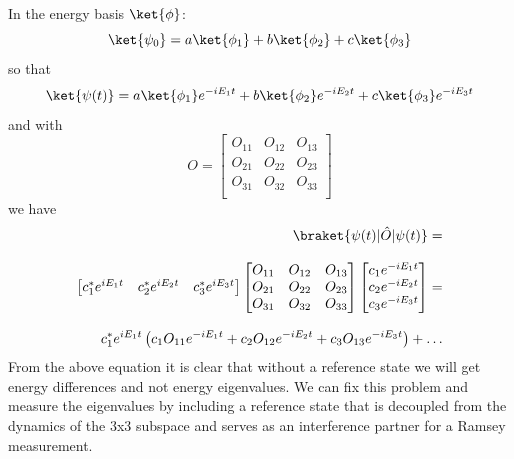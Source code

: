 In the energy basis $\ket{\phi}$:
\begin{equation*}
    \ket{\psi_0} = a\ket{\phi_1} + b\ket{\phi_2} + c\ket{\phi_3}
\end{equation*}
so that
\begin{equation*}
    \ket{\psi (t)} = a\ket{\phi_1}e^{-i E_1 t} + b\ket{\phi_2}e^{-i E_2 t} + c\ket{\phi_3}e^{-i E_3 t}
\end{equation*}
and with
\begin{equation*}
    O =
    \begin{bmatrix}
        O_{11} & O_{12} & O_{13}\\
        O_{21} & O_{22} & O_{23}\\
        O_{31} & O_{32} & O_{33}\\
    \end{bmatrix}
\end{equation*}
we have
\begin{equation*}
    \begin{aligned}
        \braket{\psi(t)|\hat{O}|\psi(t)} = \\[2.0ex]
        \begin{bmatrix}
            c_1^* e^{i E_1 t} & c_2^* e^{i E_2 t} & c_3^* e^{i E_3 t}
        \end{bmatrix}
        \begin{bmatrix}
            O_{11} & O_{12} & O_{13}\\
            O_{21} & O_{22} & O_{23}\\
            O_{31} & O_{32} & O_{33}\\
        \end{bmatrix}
        \begin{bmatrix}
            c_1 e^{-i E_1 t} \\
            c_2 e^{-i E_2 t} \\
            c_3 e^{-i E_3 t}
        \end{bmatrix} = \\[2.0 ex]
        c_1^* e^{i E_1 t} \left( c_1 O_{11} e^{-i E_1 t} + c_2 O_{12} e^{-i E_2 t} + c_3 O_{13} e^{-i E_3 t} \right) + \mathellipsis
    \end{aligned}
\end{equation*}
From the above equation it is clear that without a reference state we will get energy differences and not energy eigenvalues.
We can fix this problem and measure the eigenvalues by including a reference state that is decoupled from the dynamics of the 3x3 subspace and serves as an interference partner for a Ramsey measurement.

